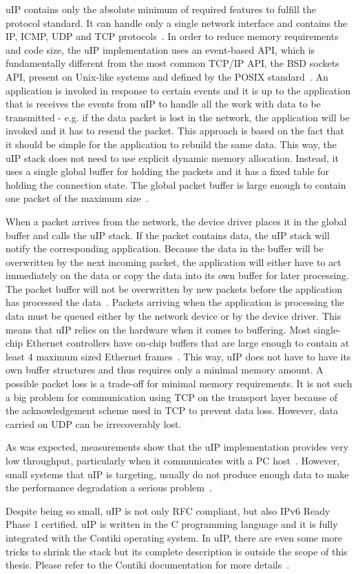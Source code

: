 uIP contains only the absolute minimum of required features to fulfill the protocol standard.
It can handle only a single network interface and contains the IP, ICMP, UDP and TCP protocols~\cite{contiki-docs}.
In order to reduce memory requirements and code size,
the uIP implementation uses an event-based API, which is fundamentally different
from the most common TCP/IP API, the BSD sockets API, present on Unix-like systems
and defined by the POSIX standard~\cite{thesis-programming,posix}.
An application is invoked in response to certain events and
it is up to the application that is receives the events from uIP to handle all the
work with data to be transmitted - e.g. if the data packet is lost in the network,
the application will be invoked and it has to resend the packet.
This approach is based on the fact that it should be simple for the application
to rebuild the same data.
This way, the uIP stack does not need to use explicit dynamic memory allocation.
Instead, it uses a single global buffer for holding the packets and it has a fixed
table for holding the connection state.
The global packet buffer is large enough to contain one packet of the maximum size~\cite{contiki-docs}.

When a packet arrives from the network, the device driver places it in the
global buffer and calls the uIP stack.
If the packet contains data, the uIP stack will notify the corresponding application.
Because the data in the buffer will be overwritten by the next incoming packet,
the application will either have to act immediately on the data or copy the data into
its own buffer for later processing.
The packet buffer will not be overwritten by new packets before the application has processed the data~\cite{contiki-docs}.
Packets arriving when the application is processing the data must be queued
either by the network device or by the device driver.
This means that uIP relies on the hardware when it comes to buffering.
Most single-chip Ethernet controllers have on-chip buffers
that are large enough to contain at least 4 maximum sized Ethernet frames~\cite{contiki-docs}.
This way, uIP does not have to have its own buffer structures and thus requires only a minimal memory amount.
A possible packet loss is a trade-off for minimal memory requirements.
It is not such a big problem for communication using TCP on the transport layer
because of the acknowledgement scheme used in TCP to prevent data loss.
However, data carried on UDP can be irrecoverably lost.

As was expected, measurements show that the uIP implementation provides very low
throughput, particularly when it communicates with a PC host~\cite{thesis-towards}.
However, small systems that uIP is targeting, usually do not produce enough data
to make the performance degradation a serious problem~\cite{thesis-towards}.

Despite being so small, uIP is not only RFC compliant, but also IPv6 Ready Phase 1 certified.
uIP is written in the C programming language and it is fully integrated with the Contiki operating system.
In uIP, there are even some more tricks to shrink the stack
but its complete description is outside the scope of this thesis.
Please refer to the Contiki documentation for more details~\cite{contiki-docs}.
